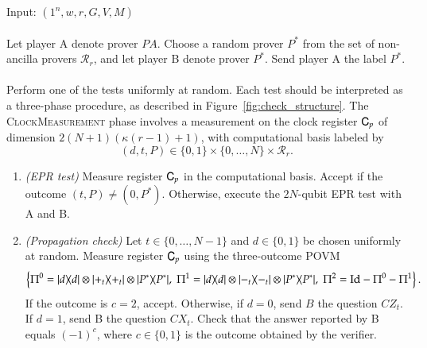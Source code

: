 \vspace{10pt}
\begin{center}
\begin{mdframed}
    Input: $(1^n,w,r,G,V,M)$ \\
    \\
	Let player A denote prover $PA$.
    Choose a random prover $P^*$ from the set of non-ancilla provers $\mathcal{R}_r$, and let player B denote prover $P^*$. Send player A the label $P^*$. \\
    \\
    Perform one of the tests uniformly at random. Each test should be interpreted as a three-phase procedure, as described in Figure~\ref{fig:check_structure}. The \textsc{ClockMeasurement} phase involves a measurement on the clock register ${\textsf{C}}_p$ of dimension $2(N+1)(\kappa(r-1)+1)$, with computational basis labeled by 
    \[
    (d,t,P)\in \{0,1\}\times \{0,\ldots,N\} \times \mathcal{R}_r .
    \]
    
	\begin{enumerate}
 \item \emph{(EPR test)} Measure register ${\textsf{C}}_{p}$ in the computational basis. Accept if the outcome $(t,P)\neq (0,P^*)$. Otherwise, execute the $2N$-qubit EPR test with A and B. \\

\item \emph{(Propagation check)} Let $t\in\{0,\ldots,N-1\}$ and $d\in\{0,1\}$ be chosen uniformly at random. Measure register ${\textsf{C}}_{p}$ using the three-outcome POVM
$$\left\{ \Pi^0 = |d\rangle\!\langle d| \otimes |+_t\rangle\!\langle+_t| \otimes |P^*\rangle\!\langle P^*|,\; \Pi^1 =  |d\rangle\!\langle d| \otimes |-_t\rangle\!\langle-_t| \otimes |P^*\rangle\!\langle P^*|,\;\Pi^2 = \mathop{\mathrm{Id}}\!\mathinner{} - \Pi^0-\Pi^1 \right\}.$$
If the outcome is $c=2$, accept. Otherwise, if $d=0$, send $B$ the question $CZ_{t}$. If $d=1$, send B the question $CX_t$. Check that the answer reported by B equals $(-1)^c$, where $c\in\{0,1\}$ is the outcome obtained by the verifier.\\


\end{enumerate}
\end{mdframed}
\end{center}
